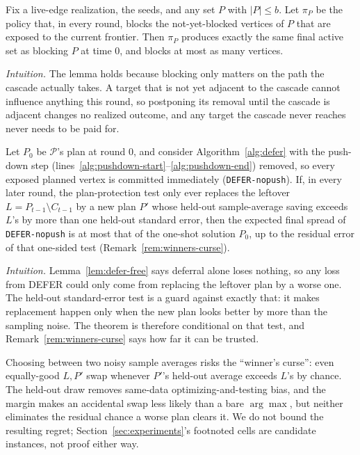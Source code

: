 \documentclass[ASNA,number]{USG}
\begin{document}
\begin{lemma}\label{lem:defer-free}
Fix a live-edge realization, the seeds, and any set $P$ with $|P|\le b$. Let
$\pi_P$ be the policy that, in every round, blocks the not-yet-blocked
vertices of $P$ that are exposed to the current frontier. Then $\pi_P$
produces exactly the same final active set as blocking $P$ at time $0$, and
blocks at most as many vertices.
\end{lemma}

\emph{Intuition.} The lemma holds because blocking only matters on the
path the cascade actually takes. A target that is not yet adjacent to the
cascade cannot influence anything this round, so postponing its removal until
the cascade is adjacent changes no realized outcome, and any target the
cascade never reaches never needs to be paid for.

\begin{theorem}\label{thm:defer-dominates}
Let $P_0$ be $\mathcal P$'s plan at round $0$, and consider Algorithm~\ref{alg:defer}
with the push-down step (lines~\ref{alg:pushdown-start}--\ref{alg:pushdown-end})
removed, so every exposed planned vertex is committed immediately
(\texttt{DEFER-nopush}). If, in every later round, the plan-protection test
only ever replaces the leftover $L=P_{t-1}\setminus C_{t-1}$ by a new plan
$P'$ whose held-out sample-average saving exceeds $L$'s by more than one
held-out standard error, then the expected final spread of
\texttt{DEFER-nopush} is at most that of the one-shot solution $P_0$, up to
the residual error of that one-sided test (Remark~\ref{rem:winners-curse}).
\end{theorem}

\emph{Intuition.} Lemma~\ref{lem:defer-free} says deferral alone loses
nothing, so any loss from DEFER could only come from replacing the leftover
plan by a worse one. The held-out standard-error test is a guard against
exactly that: it makes replacement happen only when the new plan looks
better by more than the sampling noise. The theorem is therefore
conditional on that test, and Remark~\ref{rem:winners-curse} says how far it
can be trusted.

\begin{remark}\label{rem:winners-curse}
Choosing between two noisy sample averages risks the ``winner's curse'':
even equally-good $L,P'$ swap whenever $P'$'s held-out average exceeds
$L$'s by chance. The held-out draw removes same-data optimizing-and-testing
bias, and the margin makes an accidental swap less likely than a bare
$\arg\max$, but neither eliminates the residual chance a worse plan clears
it. We do not bound the resulting regret; Section~\ref{sec:experiments}'s
footnoted cells are candidate instances, not proof either way.
\end{remark}
\end{document}
